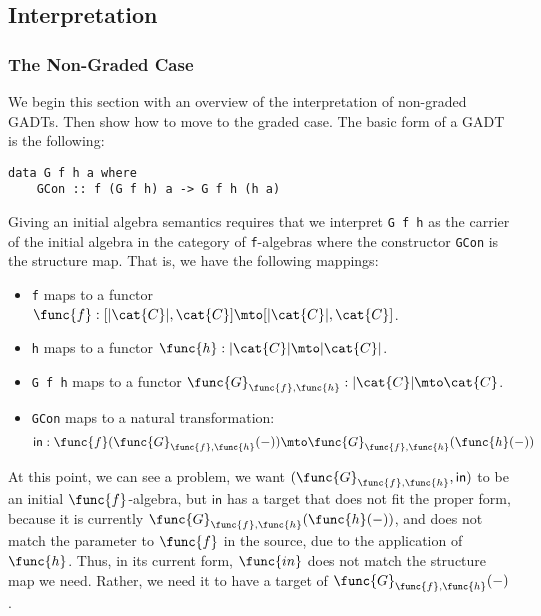 \subsection{Interpretation}
\label{subsec:interpretation}

\subsubsection{The Non-Graded Case}
\label{subsubsec:the_non_graded_case}
We begin this section with an overview of the interpretation of
non-graded GADTs.  Then show how to move to the graded case. The basic
form of a GADT is the following:
\begin{verbatim}
data G f h a where
    GCon :: f (G f h) a -> G f h (h a)
\end{verbatim}
Giving an initial algebra semantics requires that we interpret 
\verb!G f h! as the carrier of the initial algebra in the category 
of \verb!f!-algebras where the constructor \verb!GCon! is the 
structure map.  That is, we have the following mappings:
\begin{itemize}
    \item \verb!f! maps to a functor $\func{f} : [|\cat{C}|,\cat{C}]
    \mto [|\cat{C}|, \cat{C}]$.

    \item \verb!h! maps to a functor $\func{h} : |\cat{C}| \mto
    |\cat{C}|$. 

    \item \verb!G f h! maps to a functor 
$\func{G}_{\func{f},\func{h}} : |\cat{C}| \mto \cat{C}$.

    \item \verb!GCon! maps to a natural transformation:
          \[
            \mathsf{in} : \func{f}(\func{G}_{\func{f},\func{h}}(-)) \mto \func{G}_{\func{f},\func{h}}(\func{h}(-))
          \]
\end{itemize}
At this point, we can see a problem, we want $(\func{G}_{\func{f},\func{h}},
\mathsf{in})$ to be an initial $\func{f}$-algebra, but
$\mathsf{in}$ has a target that does not fit the proper form, because
it is currently $\func{G}_{\func{f},\func{h}}(\func{h}(-))$, and
does not match the parameter to $\func{f}$ in the source, due to
the application of $\func{h}$.  Thus, in its current form, $\func{in}$
does not match the structure map we need.  Rather, we need it to have
a target of $\func{G}_{\func{f},\func{h}}(-)$.

